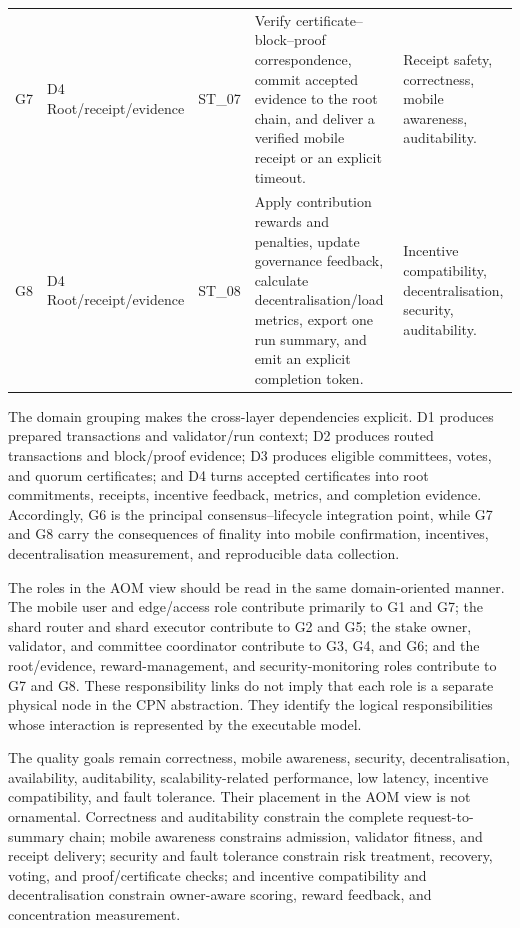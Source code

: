 \documentclass[a4paper,fleqn]{cas-sc}
\begin{document}
\begin{table}[pos=t]
\begin{tabularx}{\textwidth}{p{0.7cm}p{2.6cm}p{2.6cm}X p{3.2cm}}
G7 & D4 Root/receipt/evidence & ST\_07 &
Verify certificate--block--proof correspondence, commit accepted evidence to
the root chain, and deliver a verified mobile receipt or an explicit timeout. &
Receipt safety, correctness, mobile awareness, auditability.\\

G8 & D4 Root/receipt/evidence & ST\_08 &
Apply contribution rewards and penalties, update governance feedback,
calculate decentralisation/load metrics, export one run summary, and emit an
explicit completion token. &
Incentive compatibility, decentralisation, security, auditability.\\
\bottomrule
\end{tabularx}
\end{table}

The domain grouping makes the cross-layer dependencies explicit. D1 produces
prepared transactions and validator/run context; D2 produces routed
transactions and block/proof evidence; D3 produces eligible committees, votes,
and quorum certificates; and D4 turns accepted certificates into root
commitments, receipts, incentive feedback, metrics, and completion evidence.
Accordingly, G6 is the principal consensus--lifecycle integration point, while
G7 and G8 carry the consequences of finality into mobile confirmation,
incentives, decentralisation measurement, and reproducible data collection.

The roles in the AOM view should be read in the same domain-oriented manner.
The mobile user and edge/access role contribute primarily to G1 and G7; the
shard router and shard executor contribute to G2 and G5; the stake owner,
validator, and committee coordinator contribute to G3, G4, and G6; and the
root/evidence, reward-management, and security-monitoring roles contribute to
G7 and G8. These responsibility links do not imply that each role is a separate
physical node in the CPN abstraction. They identify the logical
responsibilities whose interaction is represented by the executable model.

The quality goals remain correctness, mobile awareness, security,
decentralisation, availability, auditability, scalability-related performance,
low latency, incentive compatibility, and fault tolerance. Their placement in
the AOM view is not ornamental. Correctness and auditability constrain the
complete request-to-summary chain; mobile awareness constrains admission,
validator fitness, and receipt delivery; security and fault tolerance constrain
risk treatment, recovery, voting, and proof/certificate checks; and
incentive compatibility and decentralisation constrain owner-aware scoring,
reward feedback, and concentration measurement.
\end{document}
